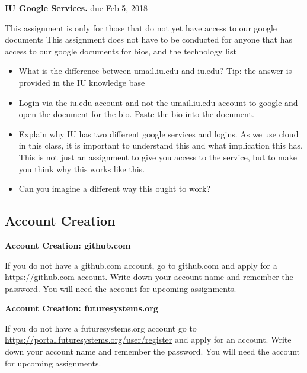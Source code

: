 \begin{exercise}\label{E:e222-iu-google}

  {\bf IU Google Services.} due Feb 5, 2018
  
  This assignment is only for those that do
  not yet have access to our google documents This assignment does not
  have to be conducted for anyone that has access to our google
  documents for bios, and the technology list

  \begin{itemize}
 
  \item What is the difference between umail.iu.edu and iu.edu? Tip:
    the answer is provided in the IU knowledge base

  \item Login via the iu.edu account and not the umail.iu.edu account
    to google and open the document for the bio. Paste the bio into
    the document.

  \item Explain why IU has two different google services and
    logins. As we use cloud in this class, it is important to
    understand this and what implication this has. This is not just an
    assignment to give you access to the service, but to make you
    think why this works like this.

  \item Can you imagine a different way this ought to work?

  \end{itemize}

\end{exercise}


\subsection{Account Creation}

\begin{exercise}

  {\bf Account Creation: github.com}
  
  If you do not have a github.com
  account, go to github.com and apply for a \url{https://github.com}
  account. Write down your account name and remember the password. You
  will need the account for upcoming assignments.

\end{exercise}

\begin{exercise}

  {\bf Account Creation: futuresystems.org}
  
  If you do not have a futuresystems.org account go to
  \url{https://portal.futuresystems.org/user/register} and apply for an
  account. Write down your account name and remember the password. You
  will need the account for upcoming assignments.

\end{exercise}

